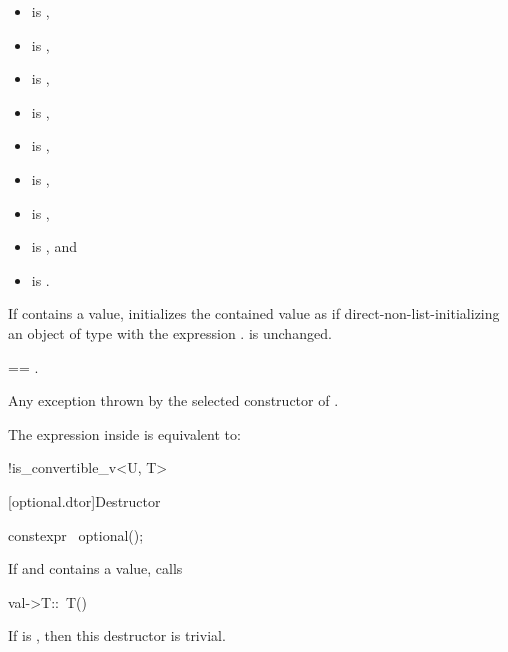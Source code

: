 \begin{itemdescr}
\pnum
\constraints
\begin{itemize}
\item {} is ,
\item {} is ,
\item {} is ,
\item {} is ,
\item {} is ,
\item {} is ,
\item {} is ,
\item {} is , and
\item {} is .
\end{itemize}

\pnum
\effects
If  contains a value,
initializes the contained value as if direct-non-list-initializing
an object of type  with the expression .
 is unchanged.

\pnum
\ensures
{} == .

\pnum
\throws
Any exception thrown by the selected constructor of .

\pnum
\remarks
The expression inside  is equivalent to:
\begin{codeblock}
!is_convertible_v<U, T>
\end{codeblock}
\end{itemdescr}

[optional.dtor]{Destructor}

%
\begin{itemdecl}
constexpr ~optional();
\end{itemdecl}

\begin{itemdescr}
\pnum
\effects
If  and  contains a value, calls
\begin{codeblock}
val->T::~T()
\end{codeblock}

\pnum
\remarks
If  is , then this destructor is trivial.
\end{itemdescr}

